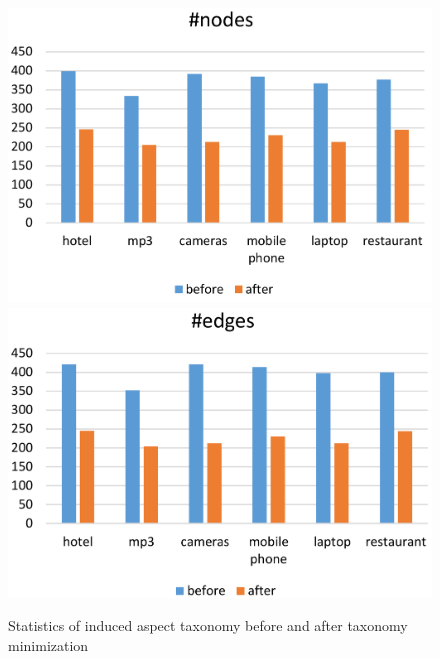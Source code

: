 
\begin{figure}[h]
	\centering
	\includegraphics[width=0.48\columnwidth]{figures/1.pdf}
	\includegraphics[width=0.48\columnwidth]{figures/2.pdf}
	\caption{Statistics of induced aspect taxonomy before and after taxonomy minimization}
	\label{fig:size}
	\vspace{-10pt}
\end{figure}


